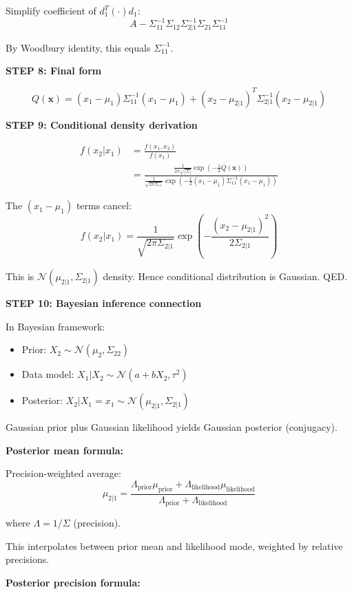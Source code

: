 \documentclass[12pt]{article}
\begin{document}
\begin{solution}
Simplify coefficient of $d_1^T(\cdot)d_1$:
\[
A - \Sigma_{11}^{-1}\Sigma_{12}\Sigma_{2|1}^{-1}\Sigma_{21}\Sigma_{11}^{-1}
\]

By Woodbury identity, this equals $\Sigma_{11}^{-1}$.

\textbf{STEP 8: Final form}

\[
Q(\mathbf{x}) = (x_1 - \mu_1)\Sigma_{11}^{-1}(x_1 - \mu_1) + (x_2 - \mu_{2|1})^T\Sigma_{2|1}^{-1}(x_2 - \mu_{2|1})
\]

\textbf{STEP 9: Conditional density derivation}

\begin{align*}
f(x_2 | x_1) &= \frac{f(x_1, x_2)}{f(x_1)} \\
&= \frac{\frac{1}{2\pi\sqrt{|\Sigma|}}\exp(-\frac{1}{2}Q(\mathbf{x}))}{\frac{1}{\sqrt{2\pi\Sigma_{11}}}\exp(-\frac{1}{2}(x_1-\mu_1)\Sigma_{11}^{-1}(x_1-\mu_1))}
\end{align*}

The $(x_1 - \mu_1)$ terms cancel:
\[
f(x_2 | x_1) = \frac{1}{\sqrt{2\pi\Sigma_{2|1}}}\exp\left(-\frac{(x_2 - \mu_{2|1})^2}{2\Sigma_{2|1}}\right)
\]

This is $\mathcal{N}(\mu_{2|1}, \Sigma_{2|1})$ density. Hence conditional distribution is Gaussian. QED.

\textbf{STEP 10: Bayesian inference connection}

In Bayesian framework:
\begin{itemize}
    \item Prior: $X_2 \sim \mathcal{N}(\mu_2, \Sigma_{22})$
    \item Data model: $X_1 | X_2 \sim \mathcal{N}(a + bX_2, \tau^2)$
    \item Posterior: $X_2 | X_1 = x_1 \sim \mathcal{N}(\mu_{2|1}, \Sigma_{2|1})$
\end{itemize}

Gaussian prior plus Gaussian likelihood yields Gaussian posterior (conjugacy).

\textbf{Posterior mean formula:}

Precision-weighted average:
\[
\mu_{2|1} = \frac{\Lambda_{\text{prior}}\mu_{\text{prior}} + \Lambda_{\text{likelihood}}\mu_{\text{likelihood}}}{\Lambda_{\text{prior}} + \Lambda_{\text{likelihood}}}
\]

where $\Lambda = 1/\Sigma$ (precision).

This interpolates between prior mean and likelihood mode, weighted by relative precisions.

\textbf{Posterior precision formula:}


\end{solution}
\end{document}

